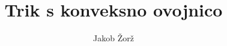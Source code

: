 \documentclass[a4paper]{article}
\begin{document}
    \title{Trik s konveksno ovojnico}
    \author{Jakob Žorž}
    \maketitle
\end{document}
